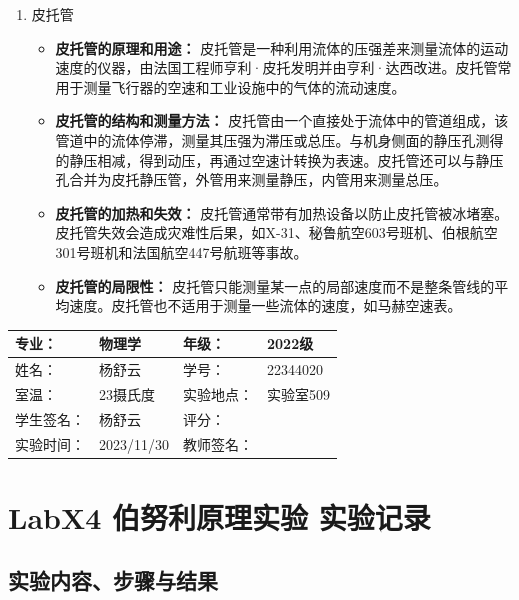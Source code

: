 \documentclass[dvipsnames, svgnames,a4paper,11pt]{article}
\begin{document}
\begin{enumerate}
		\item 皮托管
		\begin{itemize}
			\item \textbf{皮托管的原理和用途：} 皮托管是一种利用流体的压强差来测量流体的运动速度的仪器，由法国工程师亨利·皮托发明并由亨利·达西改进。皮托管常用于测量飞行器的空速和工业设施中的气体的流动速度。
			\item \textbf{皮托管的结构和测量方法：} 皮托管由一个直接处于流体中的管道组成，该管道中的流体停滞，测量其压强为滞压或总压。与机身侧面的静压孔测得的静压相减，得到动压，再通过空速计转换为表速。皮托管还可以与静压孔合并为皮托静压管，外管用来测量静压，内管用来测量总压。
			\item \textbf{皮托管的加热和失效：} 皮托管通常带有加热设备以防止皮托管被冰堵塞。皮托管失效会造成灾难性后果，如X-31、秘鲁航空603号班机、伯根航空301号班机和法国航空447号航班等事故。
			\item \textbf{皮托管的局限性：} 皮托管只能测量某一点的局部速度而不是整条管线的平均速度。皮托管也不适用于测量一些流体的速度，如马赫空速表。
		\end{itemize}		
		
	\end{enumerate}

	
	
	
	\clearpage
	\begin{table}
		\renewcommand\arraystretch{1.7}
		\centering
		\begin{tabularx}{\textwidth}{|X|X|X|X|}
			\hline
			专业： & 物理学 & 年级： & 2022级 \\
			\hline
			姓名： & 杨舒云 & 学号： & 22344020\\
			\hline
			室温： & 23摄氏度 & 实验地点： & 实验室509 \\
			\hline
			学生签名：& 杨舒云 & 评分： &\\
			\hline
			实验时间：& 2023/11/30 & 教师签名：&\\
			\hline
		\end{tabularx}
	\end{table}
	
	\section{LabX4 伯努利原理实验 \quad\heiti 实验记录}
	\subsection{实验内容、步骤与结果}
\end{document}
